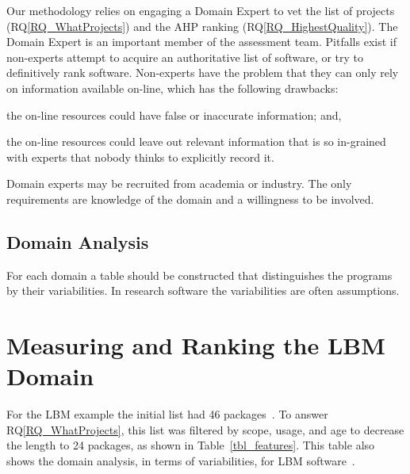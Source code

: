 \documentclass[runningheads]{llncs}
\newcommand{\rqref}[1]{RQ\ref{#1}}
\begin{document}
Our methodology relies on engaging a Domain Expert to vet the list of projects
(\rqref{RQ_WhatProjects}) and the AHP ranking (\rqref{RQ_HighestQuality}).  The
Domain Expert is an important member of the assessment
team. Pitfalls exist if non-experts attempt to acquire an authoritative list of
software, or try to definitively rank software. Non-experts have the problem
that they can only rely on information available on-line, which has the
following drawbacks:
\begin{inparaenum}[i)]
  \item the on-line resources could have false or inaccurate information; and,
  \item the on-line resources could leave out relevant information that is so
in-grained with experts that nobody thinks to explicitly record it.
\end{inparaenum}
Domain experts may be recruited from academia or industry.  The only
requirements are knowledge of the domain and a willingness to be involved.

\subsection{Domain Analysis} \label{SecDomainAnalysis}

For each domain a table should be constructed that distinguishes the programs by
their variabilities.  In research software the variabilities are often
assumptions.

\section{Measuring and Ranking the LBM Domain} \label{SecRanking}

For the LBM example the initial list had 46 packages~\cite{Michalski2021}. To
answer \rqref{RQ_WhatProjects}, this list was filtered by scope, usage, and age
to decrease the length to 24 packages, as shown in Table~\ref{tbl_features}.
This table also shows the domain analysis, in terms of variabilities, for LBM
software~\cite{Michalski2021}.
\end{document}

